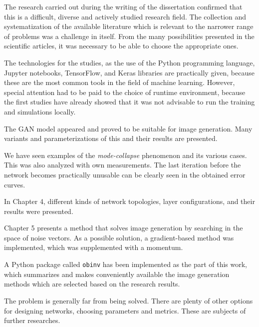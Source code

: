 
The research carried out during the writing of the dissertation confirmed that this is a difficult, diverse and actively studied research field. The collection and systematization of the available literature which is relevant to the narrower range of problems was a challenge in itself. From the many possibilities presented in the scientific articles, it was necessary to be able to choose the appropriate ones.

The technologies for the studies, as the use of the Python programming language, Jupyter notebooks, TensorFlow, and Keras libraries are practically given, because these are the most common tools in the field of machine learning. However, special attention had to be paid to the choice of runtime environment, because the first studies have already showed that it was not advisable to run the training and simulations locally.

The GAN model appeared and proved to be suitable for image generation. Many variants and parameterizations of this and their results are presented.

We have seen examples of the \textit{mode-collapse} phenomenon and its various cases. This was also analyzed with own measurements. The last iteration before the network becomes practically unusable can be clearly seen in the obtained error curves.

In Chapter 4, different kinds of network topologies, layer configurations, and their results were presented.

Chapter 5 presents a method that solves image generation by searching in the space of noise vectors. As a possible solution, a gradient-based method was implemented, which was supplemented with a momentum.

A Python package called \texttt{obinv} has been implemented as the part of this work, which summarizes and  makes conveniently available  the image generation methods which are selected based on the research results.

The problem is generally far from being solved. There are plenty of other options for designing networks, choosing parameters and metrics. These are subjects of further researches.

